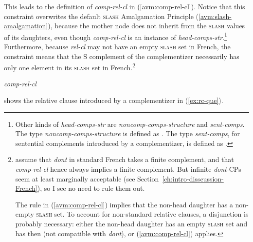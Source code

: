 This leads to the definition of \textit{comp-rel-cl} in (\ref{avm:comp-rel-cl}). Notice that this constraint overwrites the default \textsc{slash} Amalgamation Principle (\ref{avm:slash-amalgamation}), because the mother node does not inherit from the \textsc{slash} values of its daughters, even though \textit{comp-rel-cl} is an instance of \emph{head-comps-str}.\footnote{Other kinds of \emph{head-comps-str} are \emph{noncomp-comps-structure} and \emph{sent-comps}. The type \emph{noncomp-comps-structure} is defined as . The type \emph{sent-comps}, for sentential complements introduced by a complementizer, is defined as .} Furthermore, because \textit{rel-cl} may not have an empty \textsc{slash} set in French, the constraint means that the S complement of the complementizer necessarily has only one element in its \textsc{slash} set in French.\footnote{\citet{Abeille.2007.Relatives} assume that \emph{dont} in standard French takes a finite complement, and that \emph{comp-rel-cl} hence always implies a finite complement. But infinite \emph{dont}-CPs seem at least marginally acceptable (see Section~\ref{ch:intro-disscussion-French}), so I see no need to rule them out.

The rule in (\ref{avm:comp-rel-cl}) implies that the non-head daughter has a non-empty \textsc{slash} set. To account for non-standard relative clauses, a disjunction is probably necessary: either the non-head daughter has an empty \textsc{slash} set and has then  (not compatible with \emph{dont}), or  (\ref{avm:comp-rel-cl}) applies.}

\ea \textit{comp-rel-cl} 
\label{avm:comp-rel-cl}
\z

 shows the relative clause introduced by a complementizer in (\ref{ex:rc-que}).

\z 

